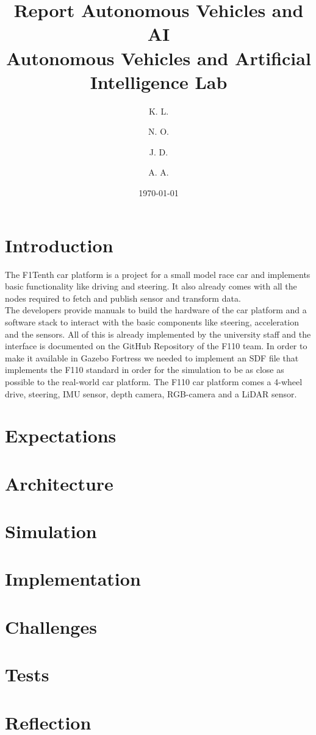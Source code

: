 \documentclass[a4paper,11pt]{article}
\title{Report Autonomous Vehicles and AI\\[1ex]
%
\large Autonomous Vehicles and Artificial Intelligence Lab}
\author{
    K. L. \\
    \and
    N. O. \\
    \and
    J. D. \\
    \and
    A. A.
}
\date{\today}
\begin{document}
\maketitle

\section{Introduction}

The F1Tenth car platform is a project for a small model race car and implements basic functionality like driving and steering. 
It also already comes with all the nodes required to fetch and publish sensor and transform data.\\
\newline
The developers provide manuals to build the hardware of the car platform and a software stack to interact with the basic components like steering, acceleration and the sensors. All of this is already implemented by the university staff and the interface is documented on the GitHub Repository of the F110 team.
In order to make it available in Gazebo Fortress we needed to implement an SDF file that implements the F110 standard in order for the simulation to be as close as possible to the real-world car platform.
The F110 car platform comes a 4-wheel drive, steering, IMU sensor, depth camera, RGB-camera and a LiDAR sensor.

\section{Expectations}


\section{Architecture}


\section{Simulation}


\section{Implementation}


\section{Challenges}


\section{Tests}



\section{Reflection}



\end{document}

